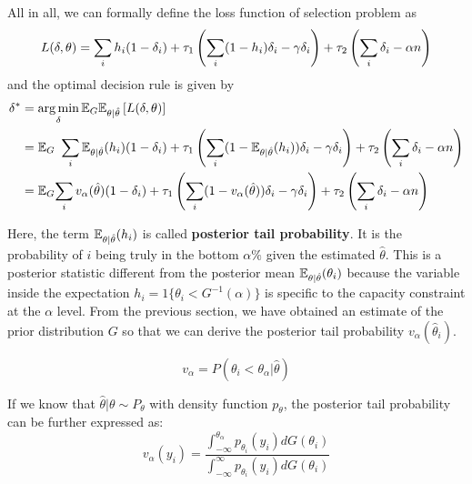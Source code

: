 \documentclass[12pt]{article}
\begin{document}
All in all, we can formally define the loss function of selection problem as
\begin{equation*}
    L(\delta,\theta)=\sum_i h_i(1-\delta_i) +\tau_1\left(\sum_i (1-h_i)\delta_i -\gamma \delta_i\right) + \tau_2 \left(\sum_i \delta_i -\alpha n\right)
\end{equation*}
and the optimal decision rule is given by
\begin{equation} \label{eq:decisionrule}
    \begin{split}
        \delta^* & =\operatorname*{arg\,min}_\delta \mathbb{E}_G\mathbb{E}_{\theta|\hat{\theta}}\left[L(\delta,\theta)\right]                                                                                                              \\
                 & = \mathbb{E}_G \ \sum_i \mathbb{E}_{\theta|\hat{\theta}}(h_i)(1-\delta_i) +\tau_1\left(\sum_i (1-\mathbb{E}_{\theta|\hat{\theta}}(h_i))\delta_i -\gamma \delta_i\right) + \tau_2 \left(\sum_i \delta_i -\alpha n\right) \\
                 & =\mathbb{E}_G{\sum_i v_\alpha(\hat{\theta})(1-\delta_i) +\tau_1\left(\sum_i (1-v_\alpha(\hat{\theta}))\delta_i -\gamma \delta_i\right) + \tau_2 \left(\sum_i \delta_i -\alpha n\right)}
    \end{split}
\end{equation}

Here, the term \(\mathbb{E}_{\theta|\hat{\theta}}(h_i)\) is called \textbf{posterior
    tail probability}. It is the probability of \(i\) being truly in the bottom
\(\alpha\%\) given the estimated \(\hat{\theta}\). This is a posterior
statistic different from the posterior mean
\(\mathbb{E}_{\theta|\hat{\theta}}(\theta_i)\) because the variable inside the
expectation \(h_i = 1\{\theta_i < G^{-1}(\alpha)\}\) is specific to the
capacity constraint at the \(\alpha\) level. From the previous section, we have
obtained an estimate of the prior distribution \(G\) so that we can derive the
posterior tail probability \(v_\alpha(\hat{\theta}_i)\).

\begin{equation*}
    v_\alpha=P( \theta_i < \theta_{\alpha} |\hat{\theta})
\end{equation*}

If we know that \(\hat{\theta}|\theta \sim P_\theta\) with density function
\(p_\theta\), the posterior tail probability can be further expressed as:
\begin{equation*}
    v_\alpha(y_i) = \frac{\int_{-\infty}^{\theta_{\alpha}} p_{\theta_i}(y_i) dG(\theta_i)}
    {\int_{-\infty}^{\infty} p_{\theta_i}(y_i) dG(\theta_i)}
\end{equation*}
\end{document}
